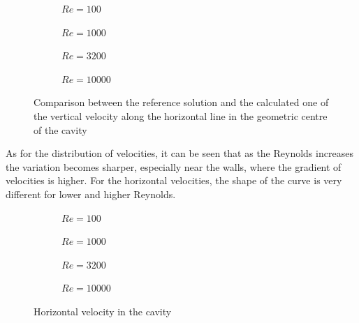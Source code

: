 \begin{figure}[h]
	\centering
	\begin{subfigure}{0.5\textwidth}
		\resizebox{1.4\textwidth}{!}{}
		\caption{$Re=100$}
	\end{subfigure}%
	\begin{subfigure}{0.5\textwidth}
		\resizebox{1.4\textwidth}{!}{}
		\caption{$Re=1000$}
	\end{subfigure}
	\begin{subfigure}{0.5\textwidth}
		\resizebox{1.4\textwidth}{!}{}
		\caption{$Re=3200$}
	\end{subfigure}%
	\begin{subfigure}{0.5\textwidth}
		\center
		\resizebox{1.4\textwidth}{!}{}
		\caption{$Re=10000$}
	\end{subfigure}
	\caption[Comparison between the reference solution and the calculated one of the vertical velocity along the horizontal line in the geometric center of the cavity]{Comparison between the reference solution and the calculated one of the vertical velocity along the horizontal line in the geometric centre of the cavity \cite{Ghia1982}}
	\label{Drivenvertical}
\end{figure}

As for the distribution of velocities, it can be seen that as the Reynolds increases the variation becomes sharper, especially near the walls, where the gradient of velocities is higher. For the horizontal velocities, the shape of the curve is very different for lower and higher Reynolds.

\begin{figure}[h]
	\centering
	\begin{subfigure}{0.5\textwidth}
		\resizebox{1.4\textwidth}{!}{}
		\caption{$Re=100$}
	\end{subfigure}%
	\begin{subfigure}{0.5\textwidth}
		\resizebox{1.4\textwidth}{!}{}
		\caption{$Re=1000$}
	\end{subfigure}
	\begin{subfigure}{0.5\textwidth}
		\resizebox{1.4\textwidth}{!}{}
		\caption{$Re=3200$}
	\end{subfigure}%
	\begin{subfigure}{0.5\textwidth}
		\center
		\resizebox{1.4\textwidth}{!}{}
		\caption{$Re=10000$}
	\end{subfigure}
	\caption{Horizontal velocity in the cavity}
	\label{DrivenHorizontalDomain}
\end{figure}

